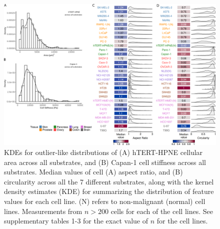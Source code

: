 \documentclass[11pt,letterpaper,english,oneside]{article} %
\begin{document}

\begin{figure}[H]
    \hspace*{-1.5cm}
    \centering
    \includegraphics[scale=0.14]{../Figures/Supplementary_Figure4/supplementary_figure4.png}
    \caption{KDEs for outlier-like distributions of (A) hTERT-HPNE cellular area across all substrates, and (B) Capan-1 cell stiffness across all substrates.
    Median values of cell (A) aspect ratio, and (B) circularity across all the 7 different substrates, along with the kernel density estimates (KDE) for summarizing the distribution of feature values for each cell line. (N) refers to non-malignant (normal) cell lines.
    Measurements from $n>200$ cells for each of the cell lines. See supplementary tables 1-3 for the exact value of $n$ for the cell lines.}
    \label{fig:fig4}
\end{figure}
\end{document}
